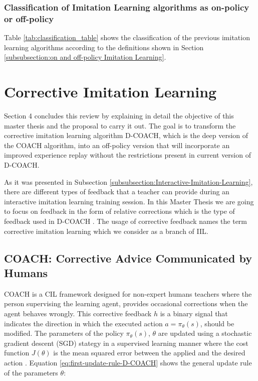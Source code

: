 \subsubsection{Classification of Imitation Learning algorithms as on-policy or off-policy}
\label{subsubsection:Classification of Imitation Learning algorithms as on-policy or off-policy}

Table \ref{tab:classification_table} shows the classification of the previous imitation learning algorithms according to the definitions shown in Section \ref{subsubsection:on and off-policy Imitation Learning}.






\section{Corrective Imitation Learning}
\label{section:Corrective Imitation Learning}


Section 4 concludes this review by explaining in detail the objective of this master thesis and the proposal to carry it out. 
The goal is to transform the corrective imitation learning algorithm D-COACH, which is the deep version of the COACH algorithm, into an off-policy version that will incorporate an improved experience replay without the restrictions present in current version of D-COACH.





As it was presented in Subsection \ref{subsubsection:Interactive-Imitation-Learning}, there are different types of feedback that a teacher can provide during an interactive imitation learning training session. In this Master Thesis we are going to focus on feedback in the form of relative corrections which is the type of feedback used in D-COACH \cite{D-COACH-Dattari-Celemin-Ruiz-del-Solar-Kober:2018}. The usage of corrective feedback names the term corrective imitation learning which we consider as a branch of IIL.


\subsection{COACH: Corrective Advice Communicated by Humans}
\label{subsection:COACH}

COACH \cite{COACH-Celemin-Ruiz-del-Solar:2015} is a CIL framework designed for non-expert humans teachers where the person supervising the learning agent, provides occasional corrections when the agent behaves wrongly. This corrective feedback $h$ is a binary signal that indicates the direction in which the executed action $a = \pi_\theta(s)$, should be modified.
The parameters of the policy $\pi_\theta(s)$, $\theta$ are updated using a stochastic gradient descent (SGD) stategy in a supervised learning manner where the cost function $J(\theta)$ is the mean squared error between the applied and the desired action \cite{Gaussian-COACH-wout:2019}. Equation \eqref{eq:first-update-rule-D-COACH} shows the general update rule of the parameters $\theta$:


